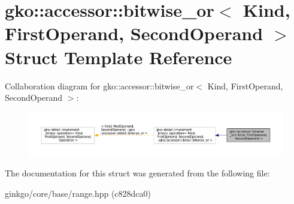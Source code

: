 \hypertarget{structgko_1_1accessor_1_1bitwise__or}{}\section{gko\+:\+:accessor\+:\+:bitwise\+\_\+or$<$ Kind, First\+Operand, Second\+Operand $>$ Struct Template Reference}
\label{structgko_1_1accessor_1_1bitwise__or}


Collaboration diagram for gko\+:\+:accessor\+:\+:bitwise\+\_\+or$<$ Kind, First\+Operand, Second\+Operand $>$\+:
\nopagebreak
\begin{figure}[H]
\begin{center}
\leavevmode
\includegraphics[width=350pt]{structgko_1_1accessor_1_1bitwise__or__coll__graph}
\end{center}
\end{figure}


The documentation for this struct was generated from the following file\+:\begin{DoxyCompactItemize}
\item 
ginkgo/core/base/range.\+hpp (c828dca0)\end{DoxyCompactItemize}
